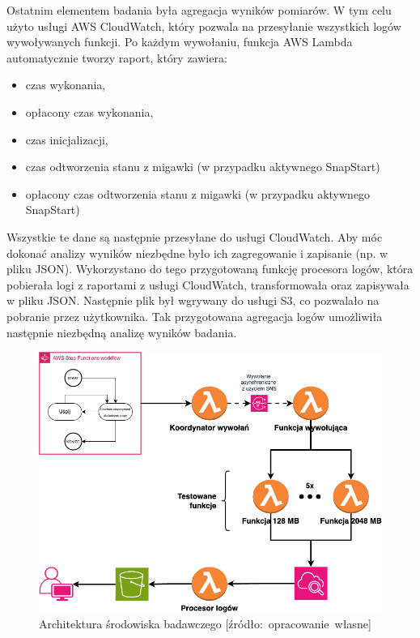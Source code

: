 Ostatnim elementem badania była agregacja wyników pomiarów.
W tym celu użyto usługi AWS CloudWatch, który pozwala na przesyłanie wszystkich logów wywoływanych funkcji.
Po każdym wywołaniu, funkcja AWS Lambda automatycznie tworzy raport, który zawiera:
\begin{itemize}
    \item czas wykonania,
    \item opłacony czas wykonania,
    \item czas inicjalizacji,
    \item czas odtworzenia stanu z migawki (w przypadku aktywnego SnapStart)
    \item opłacony czas odtworzenia stanu z migawki (w przypadku aktywnego SnapStart)
\end{itemize}
Wszystkie te dane są następnie przesyłane do usługi CloudWatch. 
Aby móc dokonać analizy wyników niezbędne było ich zagregowanie i zapisanie (np. w pliku JSON).
Wykorzystano do tego przygotowaną funkcję procesora logów, która pobierała logi z raportami z usługi CloudWatch, transformowała oraz zapisywała w pliku JSON.
Następnie plik był wgrywany do usługi S3, co pozwalało na pobranie przez użytkownika.
Tak przygotowana agregacja logów umożliwiła następnie niezbędną analizę wyników badania.

\begin{figure}[h]
    \centering
    \includegraphics[width=1\textwidth]{charts/experiment-architecture.drawio.png}
    \caption{ Architektura środowiska badawczego [źródło:~opracowanie~własne]}
    \label{fig:experiment_architecture}
\end{figure}
